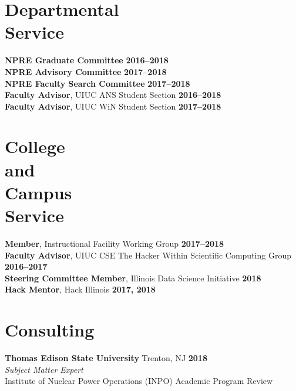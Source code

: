 \documentclass[margin,line]{resume}
\begin{document}
\begin{resume}
    \section{\mysidestyle Departmental\\Service}
		\textbf{NPRE Graduate Committee} \hfill \textbf{2016--2018}\vspace{.5mm}\\%
		\textbf{NPRE Advisory Committee} \hfill \textbf{2017--2018}\vspace{.5mm}\\%
		\textbf{NPRE Faculty Search Committee} \hfill \textbf{2017--2018}\vspace{.5mm}\\%
		\textbf{Faculty Advisor}, UIUC ANS Student Section \hfill \textbf{2016--2018}\vspace{.5mm}\\%
		\textbf{Faculty Advisor}, UIUC WiN Student Section \hfill \textbf{2017--2018}%
               \vspace{-2mm}
    \section{\mysidestyle College\\and\\Campus\\Service}
		\textbf{Member}, Instructional Facility Working Group \hfill \textbf{2017--2018}\vspace{.5mm}\\%
		\textbf{Faculty Advisor}, UIUC CSE The Hacker Within Scientific Computing Group \hfill \textbf{2016--2017}\vspace{.5mm}\\%
                \textbf{Steering Committee Member}, Illinois Data Science Initiative \hfill \textbf{2018}\vspace{.5mm}\\%
		\textbf{Hack Mentor}, Hack Illinois \hfill \textbf{2017, 2018}%
    \section{\mysidestyle Consulting}
    \textbf{Thomas Edison State University} Trenton, NJ \hfill \textbf{2018}\\
    \textsl{Subject Matter Expert} \\ 
    Institute of Nuclear Power Operations (INPO) Academic Program Review


\end{resume}
\end{document}
